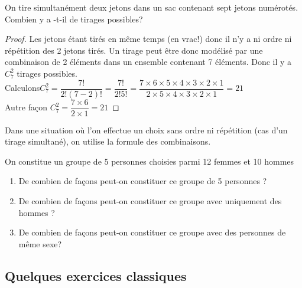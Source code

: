 \begin{exercice}

On tire simultanément deux jetons dans un sac contenant sept jetons numérotés.\\ Combien y a -t-il de tirages possibles?
\end{exercice}

\begin{proof}

Les jetons étant tirés en même temps (en vrac!) donc il n'y a ni ordre ni répétition des    2 jetons tirés.
Un tirage  peut être donc  modélisé par une combinaison de 2 éléments dans un ensemble contenant 7 éléments. 
Donc il y a $ C_{7}^{2} $ tirages possibles.\\

Calculons\quad $ C_{7}^{2}= \dfrac{7!}{2!(7-2)!}=\dfrac{7!}{2!5!}=\dfrac{7\times6\times5\times4\times3\times2\times1}{2\times 5\times4\times3\times2\times1} = 21$ \\

Autre façon \quad $ C_{7}^{2}=\dfrac{7\times6}{2\times1}=21 $
\end{proof}

\begin{remark}

Dans une situation où l'on effectue un choix sans ordre ni répétition (cas d'un tirage simultané), on utilise  la formule des combinaisons.
\end{remark}
\begin{exercice} 
On constitue un groupe de 5 personnes choisies parmi 12 femmes et 10 hommes
\begin{enumerate}
\item De combien de façons peut-on constituer ce groupe de 5 personnes ?
 \item De combien de façons peut-on constituer ce groupe avec  uniquement des hommes ?
\item De combien de façons peut-on constituer ce groupe avec des personnes de même sexe?
\end{enumerate}
  \end{exercice} 
   
  \subsection{Quelques exercices classiques}

